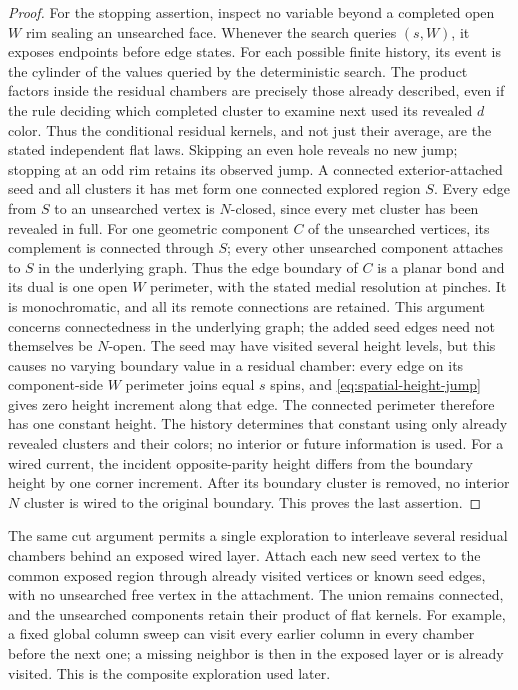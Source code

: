 \begin{proof}
For the stopping assertion, inspect no variable beyond a completed open
$W$ rim sealing an unsearched face. Whenever the search queries $(s,W)$,
it exposes endpoints before edge states. For each possible finite
history, its event is the cylinder of the values queried by the
deterministic search. The product factors inside the residual chambers
are precisely those already described, even if the rule deciding which
completed cluster to examine next used its revealed $d$ color. Thus the
conditional residual kernels, and not just their average, are the stated
independent flat laws.
Skipping an even hole reveals no new jump; stopping at an odd rim
retains its observed jump. A connected exterior-attached seed and all
clusters it has met form one connected explored region $S$. Every edge
from $S$ to an unsearched vertex is $N$-closed, since every met cluster
has been revealed in full. For one geometric component $C$ of the
unsearched vertices, its complement is connected through $S$; every
other unsearched component attaches to $S$ in the underlying graph.
Thus the edge boundary of $C$ is a planar bond and its dual is one
open $W$ perimeter, with the stated medial resolution at pinches.
It is monochromatic, and all its remote connections are retained.
This argument concerns connectedness in the underlying graph;
the added seed edges need not themselves be $N$-open.
The seed may have visited several height levels, but this causes
no varying boundary value in a residual chamber: every edge on its
component-side $W$ perimeter joins equal $s$ spins, and
\eqref{eq:spatial-height-jump} gives zero height increment along that
edge. The connected perimeter therefore has one constant height.
The history determines that constant using only already revealed
clusters and their colors; no interior or future information is used.
For a wired current,
the incident opposite-parity height differs from the boundary height by
one corner increment. After its boundary cluster is removed, no interior
$N$ cluster is wired to the original boundary. This proves the last
assertion.
\end{proof}

The same cut argument permits a single exploration to interleave several
residual chambers behind an exposed wired layer. Attach each new seed
vertex to the common exposed region through already visited vertices or
known seed edges, with no unsearched free vertex in the attachment. The
union remains connected, and the unsearched components retain their
product of flat kernels. For example, a fixed global column sweep can
visit every earlier column in every chamber before the next one; a
missing neighbor is then in the exposed layer or is already visited.
This is the composite exploration used later.

